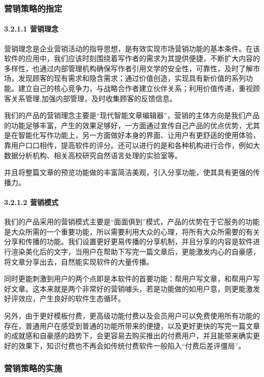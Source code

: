 \documentclass[10pt,letterpaper]{article}
\begin{document}
\subsubsection{营销策略的指定}
\paragraph{3.2.1.1 营销理念}
\rule{0pt}{0pt} 

营销理念是企业营销活动的指导思想，是有效实现市场营销功能的基本条件。在该软件的应用中，我们应该时刻围绕着写作者的需求为其提供便捷，不断扩大内容的多样性，也通过内部管理机构确保写作者引用文学的安全性，可靠性，及时了解市场，发现顾客的现有需求和隐含需求；通过价值创造，实现具有新价值的系列功能。建立自己的核心竞争力，与战略合作者建立伙伴关系；利用价值传递，重视顾客关系管理,加强内部管理，及时收集顾客的反馈信息。

我们的产品的营销理念主要是“现代智能文章编辑器”，营销的主体方向是我们产品的功能足够丰富，产生的效果足够好，一方面通过宣传自己产品的优点优势，尤其是在智能化写作功能上，另一方面做好本身的界面、让用户有更舒适的使用体验，靠用户口口相传，提高软件的评分。还可以进行的是和各种机构进行合作，例如大数据分析机构、相关高校研究自然语言处理的实验室等。

并且将整篇文章的预览功能做的丰富简洁美观，引入分享功能，使其具有更强的传播力。

\paragraph{3.2.1.2 营销模式}
\rule{0pt}{0pt} 

我们的产品采用的营销模式主要是“面面俱到”模式，产品的优势在于它服务的功能是大众所需的一个重要功能，所以需要利用大众的心理，将所有大众所需要的有关分享和传播的功能。我们设置更好更易传播的分享机制，并且分享的内容是软件进行渲染美化后的文字，当用户在帮助下写完一篇文章后，更能激发内心的自豪感，将文章分享出去，自然能实现软件的大量传播。

同时更能刺激到用户的两个点即是本软件的首要功能：帮用户写文章，和帮用户写好文章。这本来就是两个非常好的营销噱头，若是功能做的如用户意，则更能激发好评效应，产生良好的软件生态循环。

另外，由于更好模板付费，更高级功能付费以及会员用户可以免费使用所有功能的存在，普通用户在感受到普通的功能所带来的便捷，以及更好更快的写完一篇文章的成就感和自豪感的趋势下，会更容易去购买推出的付费用户，并且能带来确实更好的效果下，知识付费也不再会如传统付费软件一般陷入“付费后差评僵局”。

\subsubsection{营销策略的实施}
\end{document}
